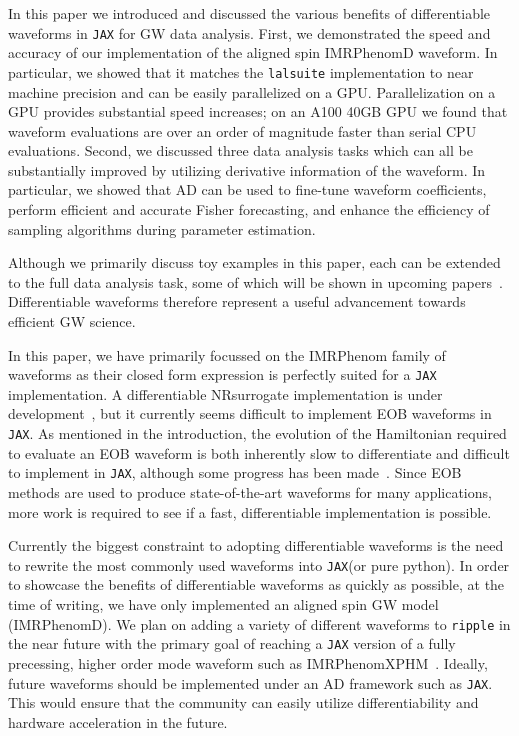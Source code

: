 \documentclass[twocolumn]{aastex631}
\newcommand{\jax}{\texttt{JAX}\xspace}
\newcommand{\ripple}{\texttt{ripple}\xspace}
\newcommand{\lalsuite}{\texttt{lalsuite}\xspace}
\begin{document}
In this paper we introduced and discussed the various benefits of differentiable waveforms in \jax for GW data analysis.
First, we demonstrated the speed and accuracy of our implementation of the aligned spin IMRPhenomD waveform.
In particular, we showed that it matches the \lalsuite implementation to near machine precision and can be easily parallelized on a GPU.
Parallelization on a GPU provides substantial speed increases; on an A100 40GB GPU we found that waveform evaluations are over an order of magnitude faster than serial CPU evaluations.
Second, we discussed three data analysis tasks which can all be substantially improved by utilizing derivative information of the waveform.
In particular, we showed that AD can be used to fine-tune waveform coefficients, perform efficient and accurate Fisher forecasting, and enhance the efficiency of sampling algorithms during parameter estimation.

Although we primarily discuss toy examples in this paper, each can be extended to the full data analysis task, some of which will be shown in upcoming papers~\citep{PEpaper}.
Differentiable waveforms therefore represent a useful advancement towards efficient GW science.

In this paper, we have primarily focussed on the IMRPhenom family of waveforms as their closed form expression is perfectly suited for a \jax implementation.
A differentiable NRsurrogate implementation is under development~\citep{NRSurAD}, but it currently seems difficult to implement EOB waveforms in \jax.
As mentioned in the introduction, the evolution of the Hamiltonian required to evaluate an EOB waveform is both inherently slow to differentiate and difficult to implement in \jax, although some progress has been made~\citep{diffrax}.
Since EOB methods are used to produce state-of-the-art waveforms for many applications, more work is required to see if a fast, differentiable implementation is possible.

Currently the biggest constraint to adopting differentiable waveforms is the need to rewrite the most commonly used waveforms into \jax (or pure python).
In order to showcase the benefits of differentiable waveforms as quickly as possible, at the time of writing, we have only implemented an aligned spin GW model (IMRPhenomD).
We plan on adding a variety of different waveforms to \ripple in the near future with the primary goal of reaching a \jax version of a fully precessing, higher order mode waveform such as IMRPhenomXPHM~\citep{Pratten:2020ceb}.
Ideally, future waveforms should be implemented under an AD framework such as \jax.
This would ensure that the community can easily utilize differentiability and hardware acceleration in the future.
\end{document}
